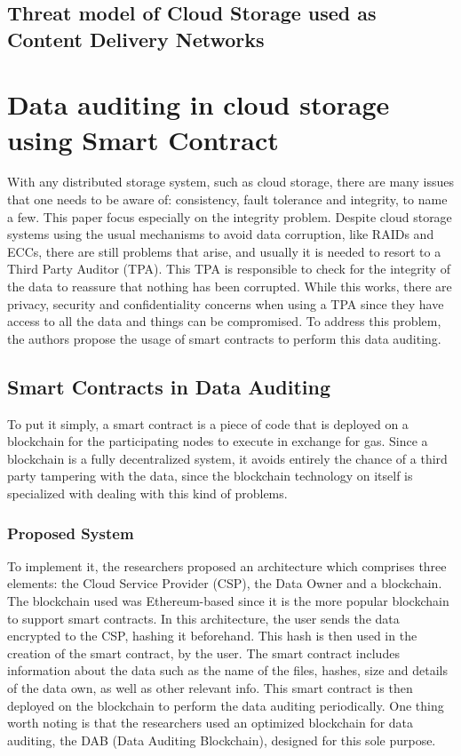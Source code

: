 \documentclass[14pt,oneside]{extreport}
\newcommand*\fpar{\hspace{1ex}}
\begin{document}
\section{Threat model of Cloud Storage used as Content Delivery Networks}


\chapter{\Large{Data auditing in cloud storage using Smart Contract \cite{paper4}}}
\vspace{-2em}
\fpar With any distributed storage system, such as cloud storage, there are many issues that one needs to be aware of: consistency, fault tolerance and integrity, to name a few. This paper focus especially on the integrity problem. Despite cloud storage systems using the usual mechanisms to avoid data corruption, like RAIDs and ECCs, there are still problems that arise, and usually it is needed to resort to a Third Party Auditor (TPA). This TPA is responsible to check for the integrity of the data to reassure that nothing has been corrupted. While this works, there are privacy, security and confidentiality concerns when using a TPA since they have access to all the data and things can be compromised. To address this problem, the authors propose the usage of smart contracts to perform this data auditing.
\section{Smart Contracts in Data Auditing}
To put it simply, a smart contract is a piece of code that is deployed on a blockchain for the participating nodes to execute in exchange for gas. Since a blockchain is a fully decentralized system, it avoids entirely the chance of a third party tampering with the data, since the blockchain technology on itself is specialized with dealing with this kind of problems.
\subsection{Proposed System}
To implement it, the researchers proposed an architecture which comprises three elements: the Cloud Service Provider (CSP), the Data Owner and a blockchain. The blockchain used was Ethereum-based since it is the more popular blockchain to support smart contracts. In this architecture, the user sends the data encrypted to the CSP, hashing it beforehand. This hash is then used in the creation of the smart contract, by the user. The smart contract includes information about the data such as the name of the files, hashes, size and details of the data own, as well as other relevant info. This smart contract is then deployed on the blockchain to perform the data auditing periodically. One thing worth noting is that the researchers used an optimized blockchain for data auditing, the DAB (Data Auditing Blockchain), designed for this sole purpose.
\end{document}
